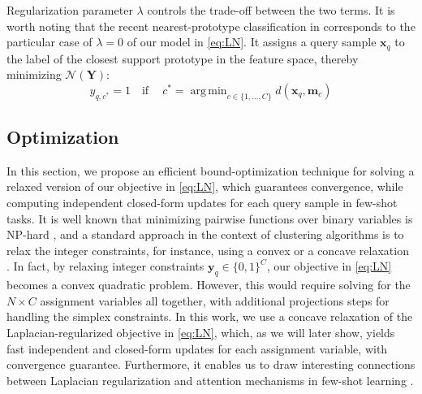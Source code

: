 \documentclass{article}
\DeclareMathOperator*{\argmin}{arg\,min}
\newcommand{\yy}{{\mathbf y}}
\newcommand{\Ncal}{\mathcal{N}}
\newcommand{\xxq}{\mathbf{x}}
\newcommand{\YY}{\mathbf Y}
\newcommand{\mm}{{\mathbf m}}
\begin{document}
Regularization parameter $\lambda$ controls the trade-off between the two terms. It is worth noting that the recent nearest-prototype classification in \cite{wang2019simpleshot} corresponds to the particular case of $\lambda = 0$ of our model in \eqref{eq:LN}. It assigns a query sample $\xxq_q$ to the label of the closest support prototype in the feature space, thereby minimizing ${\Ncal(\YY)}$:
\begin{equation}
    y_{q,c^{*}} = 1\quad \text{if}~\quad c^{*} = \argmin_{c \in \{1,\ldots, C\}}d(\xxq_q,\mm_{c})
    \label{eq:initial_pred}
\end{equation}

\subsection{Optimization}
In this section, we propose an efficient bound-optimization technique for solving a relaxed version of our objective in \eqref{eq:LN}, which guarantees convergence, while computing independent closed-form updates for each query sample in few-shot tasks. It is well known that minimizing pairwise functions over binary variables is NP-hard \cite{Tian-AAAI}, and a standard approach in the context of clustering algorithms is to relax the integer constraints, for instance, using a convex \cite{WangCarreira-Perpinan2014} or a concave relaxation \cite{ziko2018scalable}. In fact, by relaxing integer constraints $\yy_q \in\{0,1\}^C$, our objective in \eqref{eq:LN} becomes a convex quadratic problem. However, this would require solving for the $N \times C$ assignment variables all together, with additional projections steps for handling the simplex constraints. In this work, we use a concave relaxation of the Laplacian-regularized objective in \eqref{eq:LN}, which, as we will later show, yields fast independent and closed-form updates for each assignment variable, with convergence guarantee. Furthermore, it enables us to draw interesting connections between Laplacian regularization and attention mechanisms in few-shot learning \cite{Vinyals2016MatchingNF}. 
\end{document}
